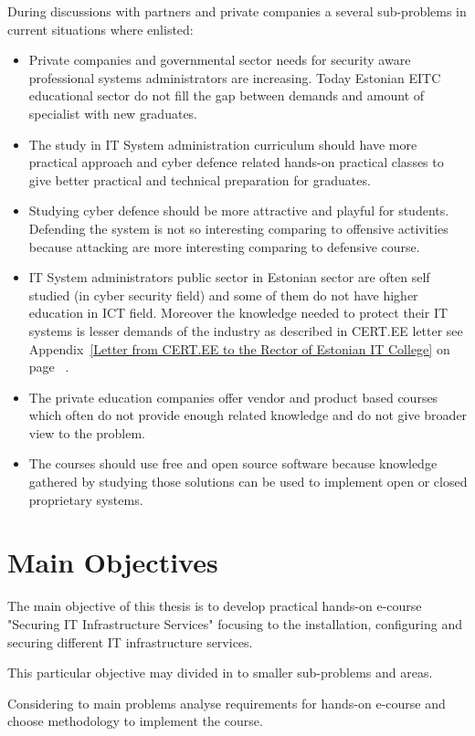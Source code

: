 During discussions with partners and private companies a several sub-problems in current situations where enlisted:
\begin{itemize}
\item Private companies and governmental sector needs for security aware professional systems administrators are increasing. Today Estonian \gls{EITC} educational sector do not fill the gap between demands and amount of specialist with new graduates.
\item The study in IT System administration curriculum should have more practical approach and cyber defence related hands-on practical classes to give better practical and technical preparation for graduates.
\item Studying cyber defence should be more attractive and playful for students. Defending the system is not so interesting comparing to offensive activities because attacking are more interesting comparing to defensive course.
\item IT System administrators public sector in Estonian sector are often self studied (in cyber security field) and some of them do not have higher education in \gls{ICT} field. Moreover the knowledge needed to protect their IT systems is lesser demands of the industry as described in CERT.EE letter see Appendix~\ref{Letter from CERT.EE to the Rector of Estonian IT College} on page ~\pageref{Letter from CERT.EE to the Rector of Estonian IT College}.
\item The private education companies offer vendor and product based courses which often do not provide enough related knowledge and do not give broader view to the problem.
\item The courses should use free and open source software because knowledge gathered by studying those solutions can be used to implement open or closed proprietary systems.
\end{itemize}

\section{Main Objectives}

The main objective of this thesis is to develop practical hands-on e-course "Securing IT Infrastructure Services" focusing to the installation, configuring and securing different IT infrastructure services.

This particular objective may divided in to smaller sub-problems and areas.

Considering to main problems analyse requirements for hands-on e-course and choose methodology to implement the course.


